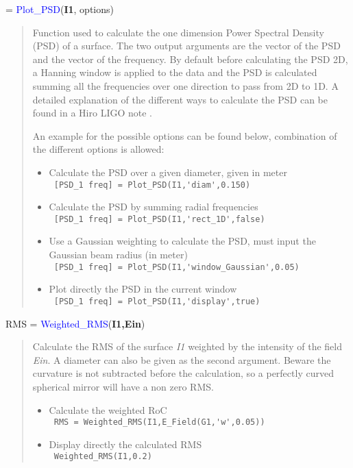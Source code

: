 \noindent {} = \textcolor{blue}{Plot\_PSD}(\textbf{I1}, options)
\vspace*{-0.2cm}
\begin{quote}
Function used to calculate the one dimension Power Spectral Density (PSD) of a surface. The two output arguments are the vector of the PSD and the vector of the frequency. By default before calculating the PSD 2D, a Hanning window is applied to the data and the PSD is calculated summing all the frequencies over one direction to pass from 2D to 1D. A detailed explanation of the different ways to calculate the PSD can be found in a Hiro LIGO note \cite{Hiro_PSD}.

An example for the possible options can be found below, combination of the different options is allowed:
\begin{itemize}
  \item Calculate the PSD over a given diameter, given in meter \\
        \verb? [PSD_1 freq] = Plot_PSD(I1,'diam',0.150) ?
  \item Calculate the PSD by summing radial frequencies \\
        \verb? [PSD_1 freq] = Plot_PSD(I1,'rect_1D',false) ?
  \item Use a Gaussian weighting to calculate the PSD, must input the Gaussian beam radius (in meter) \\
        \verb? [PSD_1 freq] = Plot_PSD(I1,'window_Gaussian',0.05) ?
  \item Plot directly the PSD in the current window \\
        \verb? [PSD_1 freq] = Plot_PSD(I1,'display',true) ?
\end{itemize}
\end{quote}


\noindent RMS = \textcolor{blue}{Weighted\_RMS}(\textbf{I1,Ein})
\vspace*{-0.2cm}
\begin{quote}
Calculate the RMS of the surface \textsl{I1} weighted by the intensity of the field \textsl{Ein}. A diameter can also be given as the second argument. Beware the curvature is not subtracted before the calculation, so a perfectly curved spherical mirror will have a non zero RMS.
\begin{itemize}
  \item Calculate the weighted RoC \\
        \verb? RMS = Weighted_RMS(I1,E_Field(G1,'w',0.05)) ?
  \item Display directly the calculated RMS \\
        \verb? Weighted_RMS(I1,0.2) ?
\end{itemize}
\end{quote}


